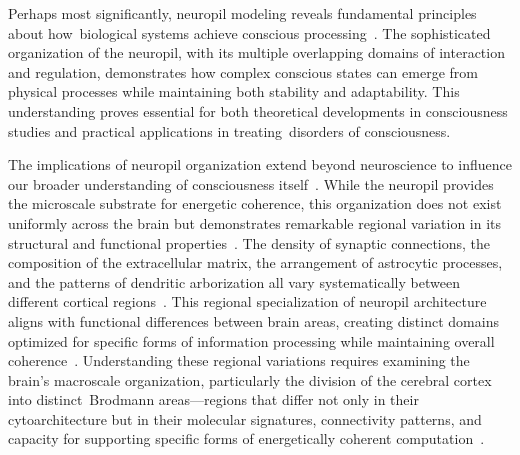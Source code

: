 Perhaps most significantly, neuropil modeling reveals fundamental principles about how~biological systems achieve conscious processing~\cite{Helmstaedter2013, breakspear2005dynamics}. The sophisticated organization of the neuropil, with its multiple overlapping domains of interaction and regulation, demonstrates how complex conscious states can emerge from physical processes while maintaining both stability and adaptability. This understanding proves essential for both theoretical developments in consciousness studies and practical applications in treating~disorders of consciousness.

The implications of neuropil organization extend beyond neuroscience to influence our broader understanding of consciousness itself~\cite{White1986, Hameroff2014}. While the neuropil provides the microscale substrate for energetic coherence, this organization does not exist uniformly across the brain but demonstrates remarkable regional variation in its structural and functional properties~\cite{Kasthuri2015, Palomero-Gallagher2019}. The density of synaptic connections, the composition of the extracellular matrix, the arrangement of astrocytic processes, and the patterns of dendritic arborization all vary systematically between different cortical regions~\cite{Glasser2016, Mishchenko2010}. This regional specialization of neuropil architecture aligns with functional differences between brain areas, creating distinct domains optimized for specific forms of information processing while maintaining overall coherence~\cite{Amunts2015, Korogod2015}. Understanding these regional variations requires examining the brain's macroscale organization, particularly the division of the cerebral cortex into distinct~Brodmann areas—regions that differ not only in their cytoarchitecture but in their molecular signatures, connectivity patterns, and capacity for supporting specific forms of energetically coherent computation~\cite{Zilles2010, Hawrylycz2012}.
